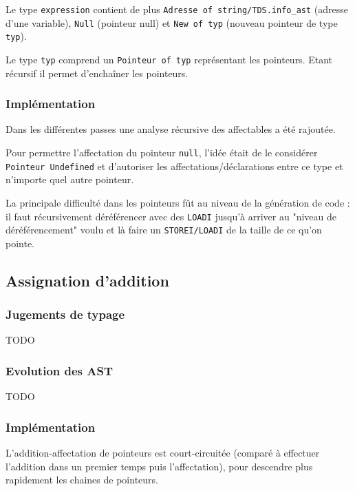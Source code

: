 \documentclass[headings=standardclasses,parskip=half]{scrartcl}
\begin{document}
Le type \texttt{expression} contient de plus
\texttt{Adresse of string/TDS.info\_ast} (adresse d'une variable),
\texttt{Null} (pointeur null) et \texttt{New of typ} (nouveau pointeur
de type \texttt{typ}).

Le type \texttt{typ} comprend un \texttt{Pointeur of typ} représentant
les pointeurs. Etant récursif il permet d'enchaîner les pointeurs.

\subsubsection*{Implémentation}

Dans les différentes passes une analyse récursive des affectables
a été rajoutée.

Pour permettre l'affectation du pointeur \texttt{null},
l'idée était de le considérer \texttt{Pointeur Undefined}
et d'autoriser les affectations/déclarations entre ce type
et n'importe quel autre pointeur.

La principale difficulté dans les pointeurs fût au niveau de
la génération de code : il faut récursivement déréférencer avec des
\texttt{LOADI} jusqu'à arriver au "niveau de déréférencement" voulu
et là faire un \texttt{STOREI/LOADI} de la taille de ce qu'on pointe.

\subsection{Assignation d'addition}

\subsubsection*{Jugements de typage}

TODO

\subsubsection*{Evolution des AST}

TODO

\subsubsection*{Implémentation}

L'addition-affectation de pointeurs est court-circuitée
(comparé à effectuer l'addition dans un premier temps
puis l'affectation), pour descendre plus rapidement les chaines
de pointeurs.
\end{document}

